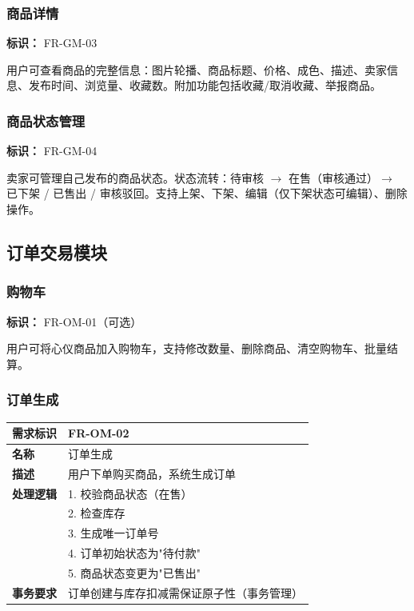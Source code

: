 \documentclass[12pt,a4paper,UTF8]{ctexart}
\begin{document}
\subsubsection{商品详情}

\textbf{标识：} FR-GM-03

用户可查看商品的完整信息：图片轮播、商品标题、价格、成色、描述、卖家信息、发布时间、浏览量、收藏数。附加功能包括收藏/取消收藏、举报商品。

\subsubsection{商品状态管理}

\textbf{标识：} FR-GM-04

卖家可管理自己发布的商品状态。状态流转：待审核 $\rightarrow$ 在售（审核通过）$\rightarrow$ 已下架 / 已售出 / 审核驳回。支持上架、下架、编辑（仅下架状态可编辑）、删除操作。

\subsection{订单交易模块}

\subsubsection{购物车}

\textbf{标识：} FR-OM-01（可选）

用户可将心仪商品加入购物车，支持修改数量、删除商品、清空购物车、批量结算。

\subsubsection{订单生成}

\begin{longtable}{p{}|p{}}
    \toprule
    \textbf{需求标识} & FR-OM-02 \\
    \midrule
    \textbf{名称} & 订单生成 \\
    \midrule
    \textbf{描述} & 用户下单购买商品，系统生成订单 \\
    \midrule
    \textbf{处理逻辑} & 
    1. 校验商品状态（在售） \\
    & 2. 检查库存 \\
    & 3. 生成唯一订单号 \\
    & 4. 订单初始状态为"待付款" \\
    & 5. 商品状态变更为"已售出" \\
    \midrule
    \textbf{事务要求} & 订单创建与库存扣减需保证原子性（事务管理） \\
    \bottomrule
\end{longtable}
\end{document}
